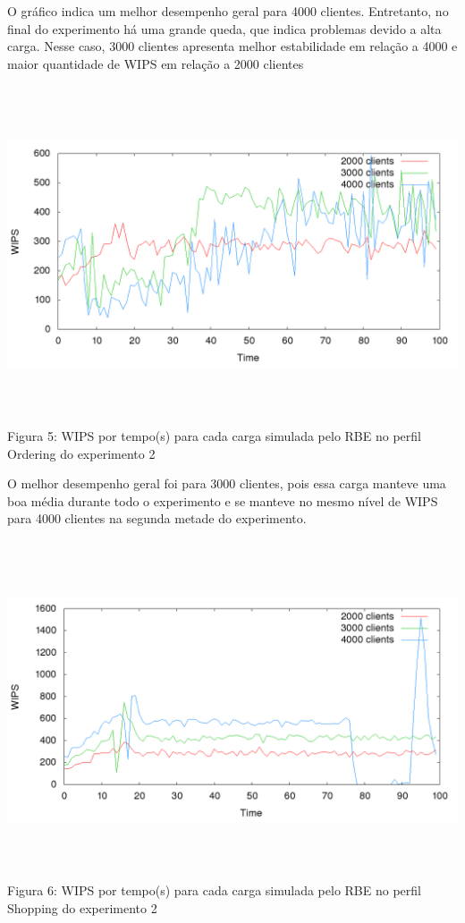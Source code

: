 \documentclass[11pt,twoside]{article}
\begin{document}
O gráfico indica um melhor desempenho geral para 4000 clientes. Entretanto, no final do experimento há uma grande queda, que indica problemas devido a alta carga. Nesse caso, 3000 clientes apresenta melhor estabilidade em relação a 4000 e maior quantidade de WIPS em relação a 2000 clientes

\begin{center}
\includegraphics[width=15cm, height=10cm]{images/exp2/plot_ordering}
Figura 5: WIPS por tempo(s) para cada carga simulada pelo RBE no perfil Ordering do experimento 2
\end{center}

O melhor desempenho geral foi para 3000 clientes, pois essa carga manteve uma boa média durante todo o experimento e se manteve no mesmo nível de WIPS para 4000 clientes na segunda metade do experimento.

\begin{center}
\includegraphics[width=15cm, height=10cm]{images/exp2/plot_shopping}
Figura 6: WIPS por tempo(s) para cada carga simulada pelo RBE no perfil Shopping do experimento 2
\end{center}
\end{document}
